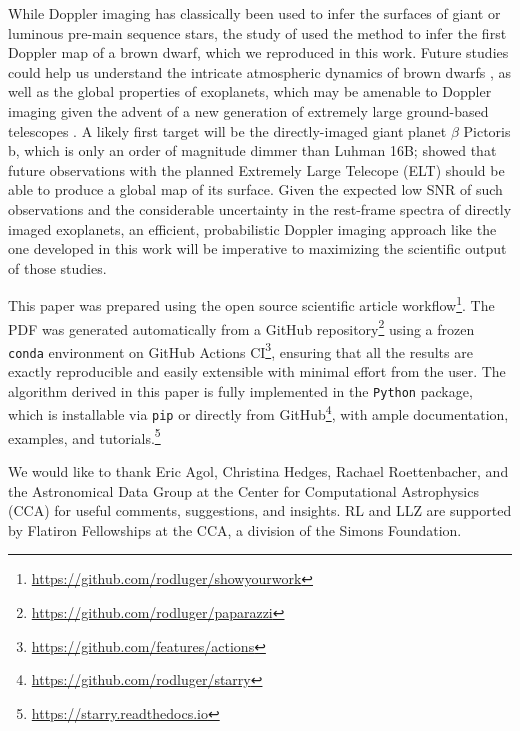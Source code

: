 \documentclass[modern]{aastex631}
\begin{document}
While Doppler imaging has classically been used to infer the surfaces of giant or luminous pre-main sequence stars, the study of \citet{Crossfield2014} used the method to infer the first Doppler map of a brown dwarf, which we reproduced in this work.
Future studies could help us understand the intricate atmospheric dynamics of brown dwarfs \citep{Tan2021a,Tan2021b}, as well as the global properties of exoplanets, which may be amenable to Doppler imaging given the advent of a new generation of extremely large ground-based telescopes \citep{Crossfield2014b}.
A likely first target will be the directly-imaged giant planet $\beta$ Pictoris b, which is only an order of magnitude dimmer than Luhman 16B; \citet{Snellen2014} showed that future observations with the planned Extremely Large Telecope (ELT) should be able to produce a global map of its surface.
Given the expected low SNR of such observations and the considerable uncertainty in the rest-frame spectra of directly imaged exoplanets, an efficient, probabilistic Doppler imaging approach like the one developed in this work will be imperative to maximizing the scientific output of those studies.

\vspace{1em}

This paper was prepared using the \showyourwork open source scientific article workflow\footnote{\url{https://github.com/rodluger/showyourwork}}.
The PDF was generated automatically from a GitHub repository\footnote{\url{https://github.com/rodluger/paparazzi}} using a frozen \texttt{conda} environment on GitHub Actions CI\footnote{\url{https://github.com/features/actions}}, ensuring that all the results are exactly reproducible and easily extensible with minimal effort from the user.
The algorithm derived in this paper is fully implemented in the \starry \texttt{Python} package, which is installable via \texttt{pip} or directly from GitHub\footnote{\url{https://github.com/rodluger/starry}}, with ample documentation, examples, and tutorials.\footnote{\url{https://starry.readthedocs.io}}

\vspace{1em}

We would like to thank Eric Agol, Christina Hedges, Rachael Roettenbacher, and the Astronomical Data Group at the Center for Computational Astrophysics (CCA) for useful comments, suggestions, and insights.
RL and LLZ are supported by Flatiron Fellowships at the CCA, a division of the Simons Foundation.

%
%
%
%
\clearpage
\appendix
%
%
%
%
\end{document}
